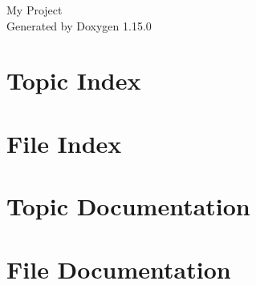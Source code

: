 \documentclass[twoside]{book}
\newcommand{\+}{\discretionary{\mbox{\scriptsize$\hookleftarrow$}}{}{}}
\newcommand{\clearemptydoublepage}{%
    \newpage{\pagestyle{empty}\cleardoublepage}%
  }
\begin{document}
  \raggedbottom
    \hypersetup{pageanchor=false,
                bookmarksnumbered=true,
                pdfencoding=unicode
               }
  \begin{titlepage}
  \vspace*{7cm}
  \begin{center}%
  {\Large My Project}\\
  \vspace*{1cm}
  {\large Generated by Doxygen 1.15.0}\\
  \end{center}
  \end{titlepage}
  \clearemptydoublepage
  \tableofcontents
  \clearemptydoublepage
  \hypersetup{pageanchor=true}
\chapter{Topic Index}

\chapter{File Index}

\chapter{Topic Documentation}

\chapter{File Documentation}















  \backmatter
  \newpage
  \clearemptydoublepage
  \printindex
\end{document}
